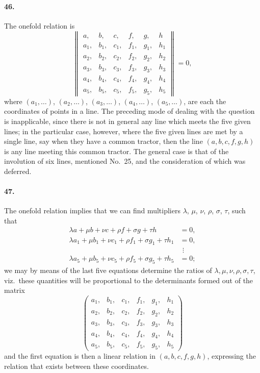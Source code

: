 \documentclass[11pt,a4paper]{article}
\begin{document}
\paragraph{46.}
The onefold relation is
\[
\begin{Vmatrix}
a, & b, & c, & f, & g, & h \\
a_1, & b_1, & c_1, & f_1, & g_1, & h_1 \\
a_2, & b_2, & c_2, & f_2, & g_2, & h_2 \\
a_3, & b_3, & c_3, & f_3, & g_3, & h_3 \\
a_4, & b_4, & c_4, & f_4, & g_4, & h_4 \\
a_5, & b_5, & c_5, & f_5, & g_5, & h_5
\end{Vmatrix} = 0,
\]
where $(a_1, \ldots)$, $(a_2, \ldots)$, $(a_3, \ldots)$, $(a_4, \ldots)$, $(a_5, \ldots)$, are each the
coordinates of points in a line. The preceding mode of dealing with the question is
inapplicable, since there is not in general any line which meets the five given lines;
in the particular case, however, where the five given lines are met by a single line,
say when they have a common tractor, then the line $(a,b,c,f,g,h)$ is any line meeting
this common tractor. The general case is that of the involution of six lines, mentioned
No.\ 25, and the consideration of which was deferred.

\paragraph{47.}
The onefold relation implies that we can find multipliers
$\lambda$, $\mu$, $\nu$, $\rho$, $\sigma$, $\tau$, such that
\begin{align*}
\lambda a + \mu b + \nu c + \rho f + \sigma g + \tau h &= 0, \\
\lambda a_1 + \mu b_1 + \nu c_1 + \rho f_1 + \sigma g_1 + \tau h_1 &= 0, \\
&\ \,\vdots \\
\lambda a_5 + \mu b_5 + \nu c_5 + \rho f_5 + \sigma g_5 + \tau h_5 &= 0;
\end{align*}
we may by means of the last five equations determine the ratios of
$\lambda, \mu, \nu, \rho, \sigma, \tau$, viz.\ these quantities will be proportional to the
determinants formed out of the matrix
\[
\begin{pmatrix}
a_1, & b_1, & c_1, & f_1, & g_1, & h_1 \\
a_2, & b_2, & c_2, & f_2, & g_2, & h_2 \\
a_3, & b_3, & c_3, & f_3, & g_3, & h_3 \\
a_4, & b_4, & c_4, & f_4, & g_4, & h_4 \\
a_5, & b_5, & c_5, & f_5, & g_5, & h_5
\end{pmatrix}
\]
and the first equation is then a linear relation in $(a,b,c,f,g,h)$, expressing the
relation that exists between these coordinates.
\end{document}
